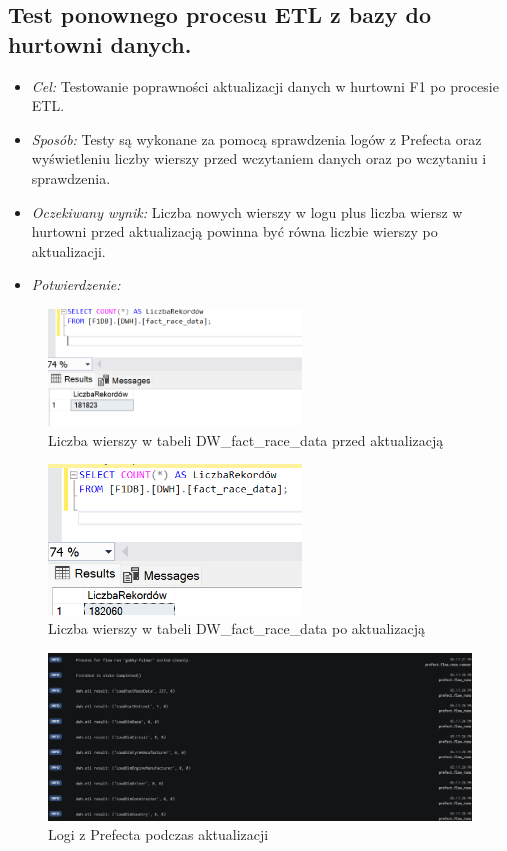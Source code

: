 \documentclass[12pt]{article}
\begin{document}
\subsection{Test ponownego procesu ETL z bazy do hurtowni danych.}
\begin{itemize}
    \item \textit{Cel:} Testowanie poprawności aktualizacji danych w hurtowni F1 po procesie ETL.
    \item \textit{Sposób:}
    Testy są wykonane za pomocą sprawdzenia logów z Prefecta oraz wyświetleniu liczby wierszy przed wczytaniem danych oraz po wczytaniu i sprawdzenia.
     \item \textit{Oczekiwany wynik:}
     Liczba nowych wierszy w logu plus liczba wiersz w hurtowni przed aktualizacją powinna być równa liczbie wierszy po aktualizacji.
      \item \textit{Potwierdzenie:}
\end{itemize}
\begin{figure}[H]
    \centering   \includegraphics[width=0.6\textwidth]{test12.png}
    \caption{Liczba wierszy w tabeli DW\_fact\_race\_data przed aktualizacją}
\end{figure}


\begin{figure}[H]
    \centering   \includegraphics[width=0.6\textwidth]{test14.png}
    \caption{Liczba wierszy w tabeli DW\_fact\_race\_data po aktualizacją}
\end{figure}

\begin{figure}[H]
    \centering   \includegraphics[width=\textwidth]{test13.png}
    \caption{Logi z Prefecta podczas aktualizacji}
\end{figure}
\end{document}
